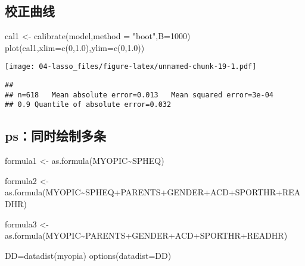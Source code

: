 \documentclass[]{ctexbook}
\newenvironment{Shaded}{\begin{snugshade}}{\end{snugshade}}
\newcommand{\AttributeTok}[1]{\textcolor[rgb]{0.77,0.63,0.00}{#1}}
\newcommand{\DecValTok}[1]{\textcolor[rgb]{0.00,0.00,0.81}{#1}}
\newcommand{\FloatTok}[1]{\textcolor[rgb]{0.00,0.00,0.81}{#1}}
\newcommand{\FunctionTok}[1]{\textcolor[rgb]{0.00,0.00,0.00}{#1}}
\newcommand{\NormalTok}[1]{#1}
\newcommand{\OtherTok}[1]{\textcolor[rgb]{0.56,0.35,0.01}{#1}}
\newcommand{\SpecialCharTok}[1]{\textcolor[rgb]{0.00,0.00,0.00}{#1}}
\newcommand{\StringTok}[1]{\textcolor[rgb]{0.31,0.60,0.02}{#1}}
\begin{document}
\hypertarget{ux6821ux6b63ux66f2ux7ebf}{%
\subsection{校正曲线}\label{ux6821ux6b63ux66f2ux7ebf}}

\begin{Shaded}
\begin{Highlighting}[]
\NormalTok{cal1 }\OtherTok{\textless{}{-}} \FunctionTok{calibrate}\NormalTok{(model,}\AttributeTok{method =} \StringTok{"boot"}\NormalTok{,}\AttributeTok{B=}\DecValTok{1000}\NormalTok{)}
\FunctionTok{plot}\NormalTok{(cal1,}\AttributeTok{xlim=}\FunctionTok{c}\NormalTok{(}\DecValTok{0}\NormalTok{,}\FloatTok{1.0}\NormalTok{),}\AttributeTok{ylim=}\FunctionTok{c}\NormalTok{(}\DecValTok{0}\NormalTok{,}\FloatTok{1.0}\NormalTok{))}
\end{Highlighting}
\end{Shaded}

\texttt{[image: 04-lasso\_files/figure-latex/unnamed-chunk-19-1.pdf]}

\begin{verbatim}
## 
## n=618   Mean absolute error=0.013   Mean squared error=3e-04
## 0.9 Quantile of absolute error=0.032
\end{verbatim}

\hypertarget{psux540cux65f6ux7ed8ux5236ux591aux6761}{%
\subsection{ps：同时绘制多条}\label{psux540cux65f6ux7ed8ux5236ux591aux6761}}

\begin{Shaded}
\begin{Highlighting}[]
\NormalTok{formula1 }\OtherTok{\textless{}{-}} \FunctionTok{as.formula}\NormalTok{(MYOPIC}\SpecialCharTok{\textasciitilde{}}\NormalTok{SPHEQ)}

\NormalTok{formula2 }\OtherTok{\textless{}{-}} \FunctionTok{as.formula}\NormalTok{(MYOPIC}\SpecialCharTok{\textasciitilde{}}\NormalTok{SPHEQ}\SpecialCharTok{+}\NormalTok{PARENTS}\SpecialCharTok{+}\NormalTok{GENDER}\SpecialCharTok{+}\NormalTok{ACD}\SpecialCharTok{+}\NormalTok{SPORTHR}\SpecialCharTok{+}\NormalTok{READHR)}

\NormalTok{formula3 }\OtherTok{\textless{}{-}} \FunctionTok{as.formula}\NormalTok{(MYOPIC}\SpecialCharTok{\textasciitilde{}}\NormalTok{PARENTS}\SpecialCharTok{+}\NormalTok{GENDER}\SpecialCharTok{+}\NormalTok{ACD}\SpecialCharTok{+}\NormalTok{SPORTHR}\SpecialCharTok{+}\NormalTok{READHR)}

\NormalTok{DD}\OtherTok{=}\FunctionTok{datadist}\NormalTok{(myopia)}
\FunctionTok{options}\NormalTok{(}\AttributeTok{datadist=}\StringTok{\textquotesingle{}DD\textquotesingle{}}\NormalTok{)}
\end{Highlighting}
\end{Shaded}
\end{document}
